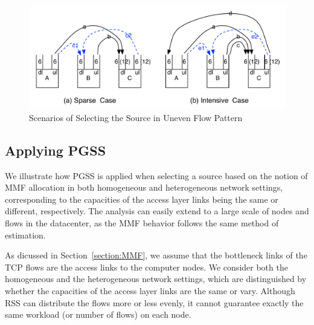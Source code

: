 \documentclass[10pt,journal,compsoc]{IEEEtran}
\begin{document}

\begin{figure}[!t]
\centering

\includegraphics[width=1\columnwidth]{figure3}

\caption{Scenarios of Selecting the Source in Uneven Flow Pattern}
\label{fig:network}
\end{figure}

\subsection{Applying PGSS}\label{section:analysis}
We illustrate how PGSS is applied when selecting a source based on the
notion of MMF allocation in both homogeneous and heterogeneous
network settings, corresponding to the capacities
of the access layer links being the same or different, respectively.
The analysis can easily extend to a large scale of nodes and flows in
the datacenter, as the MMF behavior follows the same
method of estimation.

As dicussed in Section~\ref{section:MMF}, we assume that the bottleneck links of the TCP
flows are the access links to the computer nodes.
We consider both the homogeneous and the heterogeneous network settings,
which are distinguished by whether the capacities
of the access layer links are the same or vary.
Although RSS can distribute the
flows more or less evenly, %
it cannot guarantee exactly the same workload (or number of flows) on each node. 
\end{document}
